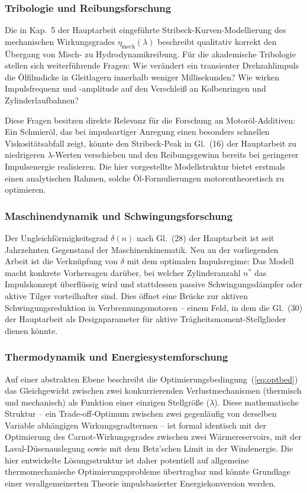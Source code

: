 ﻿\documentclass[a4paper,12pt]{article}
\begin{document}
\subsubsection{Tribologie und Reibungsforschung}

Die in Kap.~5 der Hauptarbeit eingeführte Stribeck-Kurven-Modellierung
des mechanischen Wirkungsgrades $\eta_\text{mech}(\lambda)$ beschreibt
qualitativ korrekt den Übergang von Misch- zu Hydrodynamikreibung.
Für die akademische Tribologie stellen sich weiterführende Fragen:
Wie verändert ein transienter Drehzahlimpuls die Ölfilmdicke in Gleitlagern
innerhalb weniger Millisekunden? Wie wirken Impulsfrequenz und -amplitude
auf den Verschleiß an Kolbenringen und Zylinderlaufbahnen?

Diese Fragen besitzen direkte Relevanz für die Forschung an Motoröl-Additiven:
Ein Schmieröl, das bei impulsartiger Anregung einen besonders schnellen
Viskositätsabfall zeigt, könnte den Stribeck-Peak in Gl.~(16) der Hauptarbeit
zu niedrigeren $\lambda$-Werten verschieben und den Reibungsgewinn bereits
bei geringerer Impulsenergie realisieren. Die hier vorgestellte Modellstruktur
bietet erstmals einen analytischen Rahmen, solche Öl-Formulierungen
motorentheoretisch zu optimieren.

\subsubsection{Maschinendynamik und Schwingungsforschung}

Der Ungleichförmigkeitsgrad $\delta(n)$ nach Gl.~(28) der Hauptarbeit
ist seit Jahrzehnten Gegenstand der Maschinenkinematik. Neu an der
vorliegenden Arbeit ist die Verknüpfung von $\delta$ mit dem optimalen
Impulsregime: Das Modell macht konkrete Vorhersagen darüber, bei welcher
Zylinderanzahl $n^*$ das Impulskonzept überflüssig wird und stattdessen
passive Schwingungsdämpfer oder aktive Tilger vorteilhafter sind.
Dies öffnet eine Brücke zur aktiven Schwingungsreduktion in
Verbrennungsmotoren -- einem Feld, in dem die
Gl.~(30) der Hauptarbeit als Designparameter für aktive
Trägheitsmoment-Stellglieder dienen könnte.

\subsubsection{Thermodynamik und Energiesystemforschung}

Auf einer abstrakten Ebene beschreibt die Optimierungsbedingung~(\ref{eq:optbed})
das Gleichgewicht zwischen zwei konkurrierenden Verlustmechanismen
(thermisch und mechanisch) als Funktion einer einzigen Stellgröße ($\lambda$).
Diese mathematische Struktur -- ein Trade-off-Optimum zwischen zwei
gegenläufig von derselben Variable abhängigen Wirkungsgradtermen -- ist
formal identisch mit der Optimierung des Carnot-Wirkungsgrades zwischen
zwei Wärmereservoirs, mit der Laval-Düsenauslegung sowie mit dem
Betz'schen Limit in der Windenergie. Die hier entwickelte
Lösungsstruktur ist daher potentiell auf allgemeine thermomechanische
Optimierungsprobleme übertragbar und könnte Grundlage einer verallgemeinerten
Theorie impulsbasierter Energiekonversion werden.
\end{document}
